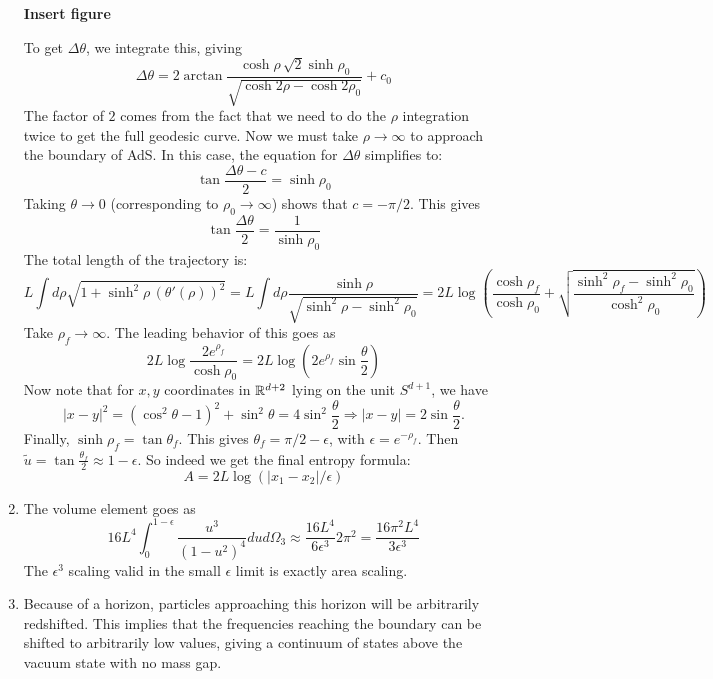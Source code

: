 \documentclass[11pt, class=article, crop=false]{standalone}
\begin{document}
\begin{enumerate}
	\textbf{Insert figure}
	
	To get $\Delta \theta$, we integrate this, giving
	\[
		\Delta \theta = 2 \arctan \frac{\cosh \rho\, \sqrt{2} \sinh \rho_0}{\sqrt{\cosh 2 \rho - \cosh 2 \rho_0}} + c_0
	\]
	The factor of $2$ comes from the fact that we need to do the $\rho$ integration twice to get the full geodesic curve. Now we must take $\rho \to \infty$ to approach the boundary of AdS. In this case, the equation for $\Delta \theta$ simplifies to:
	\[
		\tan \frac{\Delta \theta - c}{2}  = \sinh \rho_0
	\]
	Taking $\theta \to 0$ (corresponding to $\rho_0 \to \infty$) shows that $c = -\pi /2$. This gives
	\[
		\tan \frac{\Delta \theta }{2}  = \frac{1}{\sinh \rho_0}
	\]
	The total length of the trajectory is:
	\[
		L \int d\rho \sqrt{1 + \sinh^2 \rho
		\, (\theta'(\rho))^2} = L \int d\rho \frac{\sinh \rho}{\sqrt{\sinh^2 \rho - \sinh^2 \rho_0}} = 2 L  \log\left(\frac{\cosh \rho_f}{\cosh \rho_0}  +  \sqrt{\frac{\sinh^2 \rho_f - \sinh^2 \rho_0}{\cosh^2 \rho_0}}\right)
	\]
	Take $\rho_f \to \infty$. The leading behavior of this goes as
	\[
		2 L \log \frac{2 e^{\rho_f}}{\cosh \rho_0} = 2 L \log \left(2 e^{\rho_f} \sin \frac{\theta}{2} \right)
	\]
	Now note that for $x, y$ coordinates in $\mathbb{R}^{d+2}$ lying on the unit $S^{d+1}$, we have 
	\[
		|x-y|^2 = (\cos^2 \theta - 1)^2 + \sin^2 \theta = 4 \sin^2 \frac{\theta}{2} \Rightarrow |x-y| = 2 \sin \frac{\theta}{2}.
	\]
	Finally, $\sinh \rho_f = \tan \theta_f$. This gives $\theta_f = \pi/2 - \epsilon$, with $\epsilon = e^{-\rho_f}$. Then $\tilde u = \tan \frac{\theta_f}{2} \approx 1-\epsilon$. So indeed we get the final entropy formula:
	\[
		A = 2 L \log (|x_1-x_2|/\epsilon)
	\]
	
	\item The volume element goes as
	\[
		16 L^4 \int_0^{1-\epsilon} \frac{u^3}{(1-u^2)^4} du d\Omega_3 \approx \frac{16 L^4}{6 \epsilon^3} 2 \pi^2 = \frac{16 \pi^2 L^4}{3 \epsilon^3}
	\]
	The $\epsilon^3$ scaling valid in the small $\epsilon$ limit is exactly area scaling.
	
	\item Because of a horizon, particles approaching this horizon will be arbitrarily redshifted. This implies that the frequencies reaching the boundary can be shifted to arbitrarily low values, giving a continuum of states above the vacuum state with no mass gap.
	

\end{enumerate}
\end{document}
